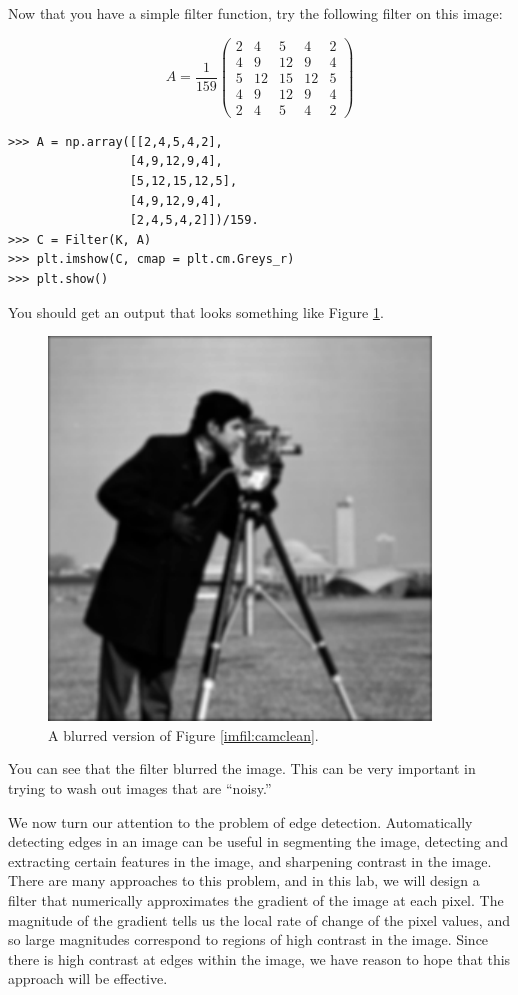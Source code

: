 Now that you have a simple filter function, try the following filter on this image:

\[
A = \frac{1}{159}\begin{pmatrix}
2&4&5&4&2\\
4&9&12&9&4\\
5&12&15&12&5\\
4&9&12&9&4\\
2&4&5&4&2
\end{pmatrix}
\]

\begin{lstlisting}
>>> A = np.array([[2,4,5,4,2],
                 [4,9,12,9,4],
                 [5,12,15,12,5],
                 [4,9,12,9,4],
                 [2,4,5,4,2]])/159.
>>> C = Filter(K, A)
>>> plt.imshow(C, cmap = plt.cm.Greys_r)
>>> plt.show()
\end{lstlisting}
You should get an output that looks something like Figure \ref{imfil:camblur}.
\begin{figure}
\includegraphics{cameramanBlur.pdf}
\caption{A blurred version of Figure \ref{imfil:camclean}.}
\label{imfil:camblur}
\end{figure}
You can see that the filter blurred the image. This can be very important in trying to 
wash out images that are ``noisy.''

We now turn our attention to the problem of edge detection. Automatically detecting edges in an image
can be useful in segmenting the image, detecting and extracting certain features in the image, and
sharpening contrast in the image. There are many approaches to this problem, and in this lab, we will
design a filter that numerically approximates the gradient of the image at each pixel. The magnitude
of the gradient tells us the local rate of change of the pixel values, and so large magnitudes 
correspond to regions of high contrast in the image. Since there is high contrast at edges within
the image, we have reason to hope that this approach will be effective.

